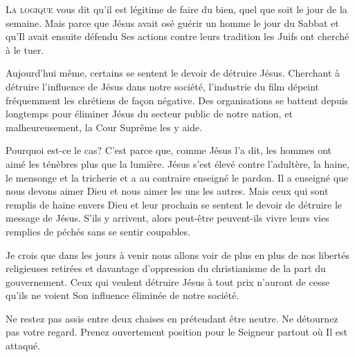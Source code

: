 




\lettrine{L}{a logique} vous dit qu'il est légitime de faire du bien,
 quel que soit le jour de la semaine.
 Mais parce que Jésus avait osé guérir un homme le jour du Sabbat
 \ocadr et qu'Il avait ensuite défendu Ses actions contre leurs tradition \fcadr{}
 les Juifs ont cherché à le tuer.

Aujourd'hui même, certains se sentent le devoir de détruire Jésus.
 Cherchant à détruire l'influence de Jésus dans notre société,
 l'industrie du film dépeint fréquemment les chrétiens de fa\c{c}on négative.
 Des organisations se battent depuis longtemps pour éliminer
 Jésus du secteur public de notre nation, et malheureusement,
 la Cour Suprême
  les y aide.


Pourquoi est-ce le cas? C'est parce que, comme Jésus l'a dit,
 les hommes ont aimé les ténèbres plus que la lumière.
 Jésus s'est élevé contre l'adultère, la haine, le mensonge
 et la tricherie et a au contraire enseigné le pardon.
 Il a enseigné que nous devons aimer Dieu et nous aimer les uns les autres.
 Mais ceux qui sont remplis de haine envers Dieu et leur prochain
 se sentent le devoir de détruire le message de Jésus.
 S'ils y arrivent, alors peut-être peuvent-ils vivre leurs vies
 remplies de péchés sans se sentir coupables.

Je crois que dans les jours à venir nous allons voir de plus en plus
 de nos libertés religieuses retirées et davantage d'oppression
 du christianisme 
 de la part du gouvernement.
 Ceux qui veulent détruire Jésus à tout prix n'auront de cesse
 qu'ils ne voient Son influence éliminée de notre société.

Ne restez pas assis entre deux chaises en prétendant être neutre.
Ne détournez pas votre regard.
 Prenez ouvertement position pour le Seigneur partout où Il est attaqué.

